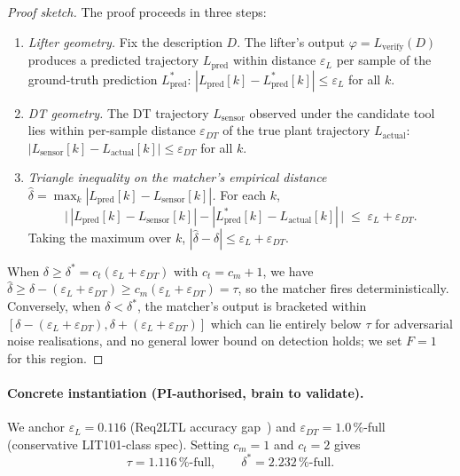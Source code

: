 \documentclass[11pt]{article}
\begin{document}
\begin{proof}[Proof sketch]
The proof proceeds in three steps:
\begin{enumerate}
\item \textit{Lifter geometry.} Fix the description $D$. The lifter's output
$\varphi = L_{\text{verify}}(D)$ produces a predicted trajectory
$L_{\text{pred}}$ within distance $\varepsilon_L$ per sample of the
ground-truth prediction $L_{\text{pred}}^{*}$:
$|L_{\text{pred}}[k] - L_{\text{pred}}^{*}[k]| \leq \varepsilon_L$ for all $k$.
\item \textit{DT geometry.} The DT trajectory $L_{\text{sensor}}$ observed
under the candidate tool lies within per-sample distance $\varepsilon_{DT}$
of the true plant trajectory $L_{\text{actual}}$:
$|L_{\text{sensor}}[k] - L_{\text{actual}}[k]| \leq \varepsilon_{DT}$ for all
$k$.
\item \textit{Triangle inequality on the matcher's empirical distance
$\hat{\delta} = \max_k |L_{\text{pred}}[k] - L_{\text{sensor}}[k]|$.}
For each $k$,
\[
\big|\,|L_{\text{pred}}[k] - L_{\text{sensor}}[k]|
   - |L_{\text{pred}}^{*}[k] - L_{\text{actual}}[k]|\,\big|
   \;\leq\;
   \varepsilon_L + \varepsilon_{DT}.
\]
Taking the maximum over $k$, $|\hat{\delta} - \delta| \leq \varepsilon_L +
\varepsilon_{DT}$.
\end{enumerate}

When $\delta \geq \delta^{*} = c_t(\varepsilon_L + \varepsilon_{DT})$ with
$c_t = c_m + 1$, we have
$\hat{\delta} \geq \delta - (\varepsilon_L + \varepsilon_{DT}) \geq c_m
(\varepsilon_L + \varepsilon_{DT}) = \tau$, so the matcher fires
deterministically. Conversely, when $\delta < \delta^{*}$, the matcher's
output is bracketed within $[\delta - (\varepsilon_L + \varepsilon_{DT}),
\delta + (\varepsilon_L + \varepsilon_{DT})]$ which can lie entirely below
$\tau$ for adversarial noise realisations, and no general lower bound on
detection holds; we set $F=1$ for this region.
\end{proof}

\paragraph{Concrete instantiation (PI-authorised, brain to validate).}
We anchor $\varepsilon_L = 0.116$ (Req2LTL accuracy
gap~\cite{req2ltl2025}) and $\varepsilon_{DT} = 1.0\,\%$-full
(conservative LIT101-class spec). Setting $c_m = 1$ and $c_t = 2$ gives
\[
\tau = 1.116\,\%\text{-full},\qquad \delta^{*} = 2.232\,\%\text{-full}.
\]
\end{document}
